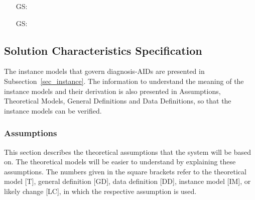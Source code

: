 \documentclass[12pt]{article}
\newcounter{goalnum} %
\begin{document}
\begin{itemize}

\item[GS\refstepcounter{goalnum}\thegoalnum \label{G_determine-clearing
-rate}:] 

\item[GS\refstepcounter{goalnum}\thegoalnum \label{G_predict-VL-30}:] 

\end{itemize}

\subsection{Solution Characteristics Specification}

The instance models that govern diagnosis-AIDs are presented in
Subsection~\ref{sec_instance}.  The information to understand the meaning of the
instance models and their derivation is also presented in Assumptions, 
Theoretical Models, General Definitions and Data Definitions, so that the 
instance models can be verified.

\subsubsection{Assumptions} \label{sec_assumpt}

This section describes the theoretical assumptions that the system will be 
based on. The theoretical models will be easier to understand by explaining 
these assumptions. The numbers given in the square brackets refer to the theoretical model [T], general definition [GD], data definition [DD], instance model [IM], or likely change [LC], in which the respective assumption is used.
\end{document}
